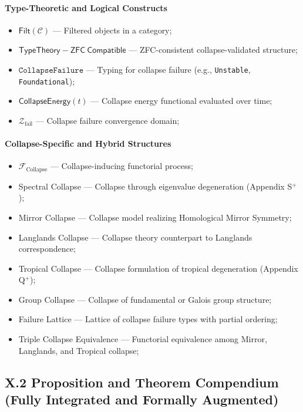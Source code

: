 \documentclass[11pt]{article}
\begin{document}
\paragraph{Type-Theoretic and Logical Constructs}
\begin{itemize}
    \item $\mathsf{Filt}(\mathcal{C})$ — Filtered objects in a category;
    \item $\mathsf{TypeTheory{-}ZFC\ Compatible}$ — ZFC-consistent collapse-validated structure;
    \item $\texttt{CollapseFailure}$ — Typing for collapse failure (e.g., \texttt{Unstable}, \texttt{Foundational});
    \item $\mathsf{CollapseEnergy}(t)$ — Collapse energy functional evaluated over time;
    \item $\mathcal{Z}_{\mathrm{fail}}$ — Collapse failure convergence domain;
\end{itemize}

\paragraph{Collapse-Specific and Hybrid Structures}
\begin{itemize}
    \item $\mathcal{F}_{\mathrm{Collapse}}$ — Collapse-inducing functorial process;
    \item Spectral Collapse — Collapse through eigenvalue degeneration (Appendix S$^{+}$);
    \item Mirror Collapse — Collapse model realizing Homological Mirror Symmetry;
    \item Langlands Collapse — Collapse theory counterpart to Langlands correspondence;
    \item Tropical Collapse — Collapse formulation of tropical degeneration (Appendix Q$^{+}$);
    \item Group Collapse — Collapse of fundamental or Galois group structure;
    \item Failure Lattice — Lattice of collapse failure types with partial ordering;
    \item Triple Collapse Equivalence — Functorial equivalence among Mirror, Langlands, and Tropical collapse;
\end{itemize}

\subsection*{X.2 Proposition and Theorem Compendium (Fully Integrated and Formally Augmented)}
\end{document}
